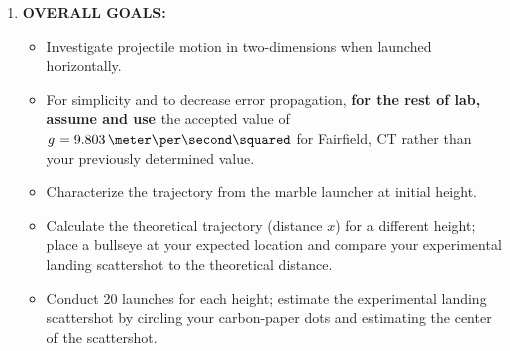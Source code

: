 \begin{enumerate}
\item \textbf{OVERALL GOALS:} 
\begin{itemize}
    \item Investigate projectile motion in two-dimensions when launched horizontally.
    \item For simplicity and to decrease error propagation, \textbf{for the rest of lab, assume and use} the accepted value of $g = 9.803\,\meter\per\second\squared$ for Fairfield, CT rather than your previously determined value.
    \item Characterize the trajectory from the marble launcher at initial height.
    \item Calculate the theoretical trajectory (distance $x$) for a different height; place a bullseye at your expected location and compare your experimental landing scattershot to the theoretical distance.
    \item Conduct 20 launches for each height; estimate the experimental landing scattershot by circling your carbon-paper dots and estimating the center of the scattershot.
\end{itemize}



\end{enumerate}
